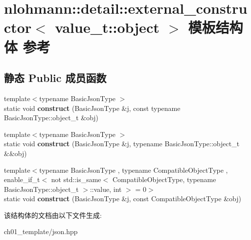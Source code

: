 \hypertarget{structnlohmann_1_1detail_1_1external__constructor_3_01value__t_1_1object_01_4}{}\section{nlohmann\+::detail\+::external\+\_\+constructor$<$ value\+\_\+t\+::object $>$ 模板结构体 参考}
\label{structnlohmann_1_1detail_1_1external__constructor_3_01value__t_1_1object_01_4}
\subsection*{静态 Public 成员函数}
\begin{DoxyCompactItemize}
\item 
\mbox{\label{structnlohmann_1_1detail_1_1external__constructor_3_01value__t_1_1object_01_4_a3a369c5d49596dd4411e368425f9ac7a}} 
{\footnotesize template$<$typename Basic\+Json\+Type $>$ }\\static void {\bfseries construct} (Basic\+Json\+Type \&j, const typename Basic\+Json\+Type\+::object\+\_\+t \&obj)
\item 
\mbox{\label{structnlohmann_1_1detail_1_1external__constructor_3_01value__t_1_1object_01_4_a1e044961affbd6417386d6e9f1d545e9}} 
{\footnotesize template$<$typename Basic\+Json\+Type $>$ }\\static void {\bfseries construct} (Basic\+Json\+Type \&j, typename Basic\+Json\+Type\+::object\+\_\+t \&\&obj)
\item 
\mbox{\label{structnlohmann_1_1detail_1_1external__constructor_3_01value__t_1_1object_01_4_a91f89abe0ec4dec59099b691682ff927}} 
{\footnotesize template$<$typename Basic\+Json\+Type , typename Compatible\+Object\+Type , enable\+\_\+if\+\_\+t$<$ not std\+::is\+\_\+same$<$ Compatible\+Object\+Type, typename Basic\+Json\+Type\+::object\+\_\+t $>$\+::value, int $>$  = 0$>$ }\\static void {\bfseries construct} (Basic\+Json\+Type \&j, const Compatible\+Object\+Type \&obj)
\end{DoxyCompactItemize}


该结构体的文档由以下文件生成\+:\begin{DoxyCompactItemize}
\item 
ch01\+\_\+template/json.\+hpp\end{DoxyCompactItemize}
